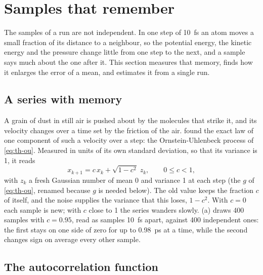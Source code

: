\section{Samples that remember}
\label{sec:cv-correlation}

The samples of a run are not independent. In one step of
\SI{10}{\femto\second} an atom moves a small fraction of its distance to a
neighbour, so the potential energy, the kinetic energy and the pressure
change little from one step to the next, and a sample says much about the
one after it. This section measures that memory, finds how it enlarges the
error of a mean, and estimates it from a single run.

\subsection*{A series with memory}

A grain of dust in still air is pushed about by the molecules that strike
it, and its velocity changes over a time set by the friction of the air.
 found the exact law of one component of such a
velocity over a step: the Ornstein-Uhlenbeck process of \cref{eq:th-ou}.
Measured in units of its own standard deviation, so that its variance is
1, it reads
\begin{equation}
   x_{k+1} = c\,x_k + \sqrt{1 - c^2}\;z_k , \qquad 0 \le c < 1 ,
   \label{eq:cv-ou}
\end{equation}
with $z_k$ a fresh Gaussian number of mean 0 and variance 1 at each step
(the $g$ of \cref{eq:th-ou}, renamed because $g$ is needed below).
The old value keeps the fraction $c$ of itself, and the noise supplies the
variance that this loses, $1 - c^2$. With $c = 0$ each sample is new; with
$c$ close to 1 the series wanders slowly. (a) draws 400
samples with $c = 0.95$, read as samples \SI{10}{\femto\second} apart,
against 400 independent ones: the first stays on one side of zero for up
to \SI{0.98}{\pico\second} at a time, while the second changes sign on
average every other sample.

\subsection*{The autocorrelation function}

